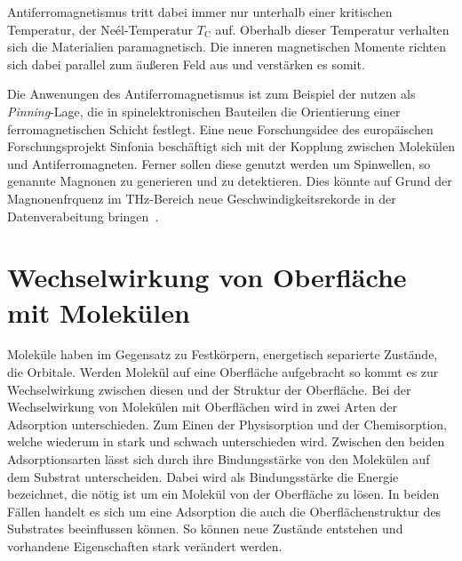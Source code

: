         Antiferromagnetismus tritt dabei immer nur unterhalb einer kritischen Temperatur, der Neél-Temperatur $T_\text{C}$ auf.
        Oberhalb dieser Temperatur verhalten sich die Materialien paramagnetisch.
        Die inneren magnetischen Momente richten sich dabei parallel zum äußeren Feld aus und verstärken es somit.
        
        Die Anwenungen des Antiferromagnetismus ist zum Beispiel der nutzen als \textit{Pinning}-Lage, die in spinelektronischen Bauteilen die Orientierung einer ferromagnetischen Schicht festlegt.
        Eine neue Forschungsidee des europäischen Forschungsprojekt Sinfonia beschäftigt sich mit der Kopplung zwischen Molekülen und Antiferromagneten.
        Ferner sollen diese genutzt werden um Spinwellen, so genannte Magnonen zu generieren und zu detektieren.
        Dies könnte auf Grund der Magnonenfrquenz im \si{\tera\hertz}-Bereich neue Geschwindigkeitsrekorde in der Datenverabeitung bringen~\cite{SINFONIA}.
        
            
    
    \section{Wechselwirkung von Oberfläche mit Molekülen}
        Moleküle haben im Gegensatz zu Festkörpern, energetisch separierte Zustände, die Orbitale.
        Werden Molekül auf eine Oberfläche aufgebracht so kommt es zur Wechselwirkung zwischen diesen und der Struktur der Oberfläche.
        Bei der Wechselwirkung von Molekülen mit Oberflächen wird in zwei Arten der Adsorption unterschieden. 
        Zum Einen der Physisorption und der Chemisorption, welche wiederum in stark und schwach unterschieden wird.
        Zwischen den beiden Adsorptionsarten lässt sich durch ihre Bindungsstärke von den Molekülen auf dem Substrat unterscheiden.
        Dabei wird als Bindungsstärke die Energie bezeichnet, die nötig ist um ein Molekül von der Oberfläche zu lösen.
        In beiden Fällen handelt es sich um eine Adsorption die auch die Oberflächenstruktur des Substrates beeinflussen können.
        So können neue Zustände entstehen und vorhandene Eigenschaften stark verändert werden.
        
